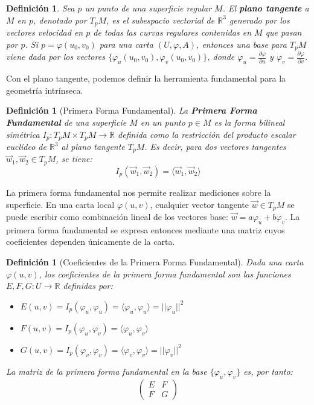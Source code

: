 \documentclass[12pt, a4paper]{report}
\theoremstyle{miestilo}
\theoremstyle{midefinicion}
\newtheorem{definicion}[teorema]{Definición}
\begin{document}
\begin{definicion}
Sea $p$ un punto de una superficie regular $M$. El \textbf{plano tangente} a $M$ en $p$, denotado por $T_pM$, es el subespacio vectorial de $\mathbb{R}^3$ generado por los vectores velocidad en $p$ de todas las curvas regulares contenidas en $M$ que pasan por $p$. Si $p = \varphi(u_0, v_0)$ para una carta $(U, \varphi, A)$, entonces una base para $T_pM$ viene dada por los vectores $\{\varphi_u(u_0, v_0), \varphi_v(u_0, v_0)\}$, donde $\varphi_u = \frac{\partial\varphi}{\partial u}$ y $\varphi_v = \frac{\partial\varphi}{\partial v}$.
\end{definicion}

Con el plano tangente, podemos definir la herramienta fundamental para la geometría intrínseca.

\begin{definicion}[Primera Forma Fundamental]
La \textbf{Primera Forma Fundamental} de una superficie $M$ en un punto $p \in M$ es la forma bilineal simétrica $I_p: T_pM \times T_pM \to \mathbb{R}$ definida como la restricción del producto escalar euclídeo de $\mathbb{R}^3$ al plano tangente $T_pM$. Es decir, para dos vectores tangentes $\vec{w}_1, \vec{w}_2 \in T_pM$, se tiene:
$$I_p(\vec{w}_1, \vec{w}_2) = \langle \vec{w}_1, \vec{w}_2 \rangle$$
\end{definicion}

La primera forma fundamental nos permite realizar mediciones sobre la superficie. En una carta local $\varphi(u,v)$, cualquier vector tangente $\vec{w} \in T_pM$ se puede escribir como combinación lineal de los vectores base: $\vec{w} = a\varphi_u + b\varphi_v$. La primera forma fundamental se expresa entonces mediante una matriz cuyos coeficientes dependen únicamente de la carta.

\begin{definicion}[Coeficientes de la Primera Forma Fundamental]
Dada una carta $\varphi(u,v)$, los coeficientes de la primera forma fundamental son las funciones $E, F, G: U \to \mathbb{R}$ definidas por:
\begin{itemize}
    \item $E(u,v) = I_p(\varphi_u, \varphi_u) = \langle \varphi_u, \varphi_u \rangle = ||\varphi_u||^2$
    \item $F(u,v) = I_p(\varphi_u, \varphi_v) = \langle \varphi_u, \varphi_v \rangle$
    \item $G(u,v) = I_p(\varphi_v, \varphi_v) = \langle \varphi_v, \varphi_v \rangle = ||\varphi_v||^2$
\end{itemize}
La matriz de la primera forma fundamental en la base $\{\varphi_u, \varphi_v\}$ es, por tanto:
$$\begin{pmatrix} E & F \\ F & G \end{pmatrix}$$
\end{definicion}
\end{document}
